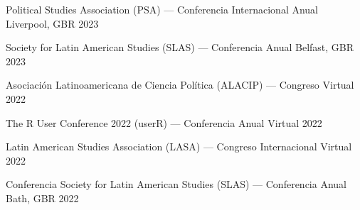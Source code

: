 \begin{cvhonors}
\cvconf
{Political Studies Association (PSA) --- Conferencia Internacional Anual} 
{Liverpool, GBR}
{2023}
\end{cvhonors}

\begin{cvhonors}
\cvconf
{Society for Latin American Studies (SLAS) --- Conferencia Anual} 
{Belfast, GBR}
{2023}
\end{cvhonors}




\begin{cvhonors}
\cvconf
{Asociación Latinoamericana de Ciencia Política (ALACIP) --- Congreso} 
{Virtual}
{2022}
\end{cvhonors}


\begin{cvhonors}
\cvconf
{The R User Conference 2022 (userR) --- Conferencia Anual} 
{Virtual}
{2022}
\end{cvhonors}

\begin{cvhonors}
\cvconf
{ Latin American Studies Association (LASA) --- Congreso Internacional} 
{Virtual}
{2022}
\end{cvhonors}

\begin{cvhonors}
\cvconf
{Conferencia Society for Latin American Studies (SLAS) --- Conferencia Anual} 
{Bath, GBR}
{2022}
\end{cvhonors}



